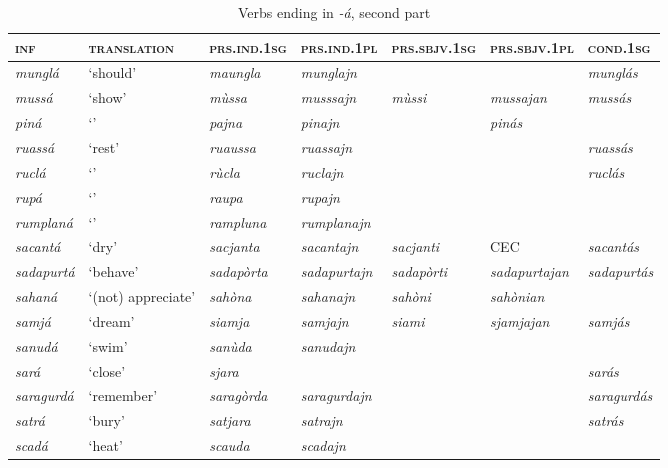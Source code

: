 \begin{sidewaystable} 
	\caption{Verbs ending in \textit{-á}, second part}
	\label{}
	\begin{tabularx}{\textwidth}{lllllll} 
		\lsptoprule
		\textsc{\textbf{inf}} & \textsc{\textbf{translation}} & \textsc{\textbf{prs.ind.1sg}} & \textsc{\textbf{prs.ind.1pl}} & \textsc{\textbf{prs.sbjv.1sg}} & \textsc{\textbf{prs.sbjv.1pl}} & \textsc{\textbf{cond.1sg}}\\
		\midrule
		\textit{munglá} & ‘should’ & \textit{maungla} & \textit{munglajn} & & & \textit{munglás}\\
		\textit{mussá} & ‘show’ & \textit{mùssa} & \textit{musssajn} & \textit{mùssi} & \textit{mussajan} & \textit{mussás}\\ 
		\textit{piná} & `' & \textit{pajna} & \textit{pinajn} & & \textit{pinás}\\
		\textit{ruassá} &`rest' & \textit{ruaussa} & \textit{ruassajn} & & & \textit{ruassás}\\
		\textit{ruclá} & `' & \textit{rùcla} & \textit{ruclajn} & & & \textit{ruclás}\\
		\textit{rupá} & `' & \textit{raupa} & \textit{rupajn} \\
		\textit{rumplaná} & `' & \textit{rampluna} & \textit{rumplanajn} \\
		\textit{sacantá} & ‘dry’ & \textit{sacjanta} & \textit{sacantajn} & \textit{sacjanti} & CEC & \textit{sacantás}\\
		\textit{sadapurtá} & ‘behave’ & \textit{sadapòrta} & \textit{sadapurtajn} & \textit{sadapòrti} & \textit{sadapurtajan} & \textit{sadapurtás}\\
		\textit{sahaná} & ‘(not) appreciate’ & \textit{sahòna} & \textit{sahanajn} & \textit{sahòni} & \textit{sahònian}\\ 
		\textit{samjá} & ‘dream’ & \textit{siamja} & \textit{samjajn} & \textit{siami} & \textit{sjamjajan} & \textit{samjás}\\ 
		\textit{sanudá} & `swim' & \textit{sanùda} & \textit{sanudajn} \\
		\textit{sará} & `close' & \textit{sjara} & & & & \textit{sarás} \\
		\textit{saragurdá} & `remember' & \textit{saragòrda} & \textit{saragurdajn} & & & \textit{saragurdás}\\
		\textit{satrá} & `bury' & \textit{satjara} & \textit{satrajn} & & & \textit{satrás}\\
		\textit{scadá} & `heat' & \textit{scauda} & \textit{scadajn}\\

\end{tabularx}
\end{sidewaystable}
